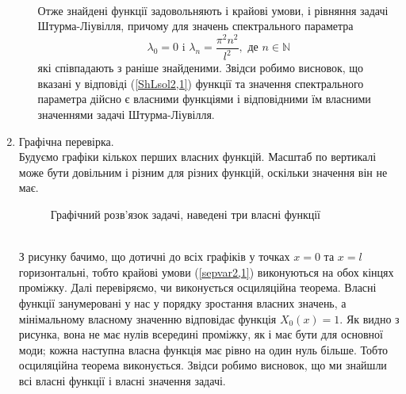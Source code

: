 \begin{enumerate}[wide, labelindent=0pt]
\begin{enumerate}
\begin{equation*}
\begin{aligned}
            \end{aligned} 
        \end{equation*}
        Отже знайдені функції задовольняють і крайові умови, і рівняння задачі Штурма-Ліувілля, причому для значень спектрального параметра \begin{equation}
        \lambda_0 = 0 \text{ i }\lambda_n = \frac{\pi^2 n^2}{l^2}, \text{ де } n \in \mathbb{N}
        \end{equation}які співпадають з раніше знайденими. Звідси робимо висновок, що вказані у відповіді (\ref{ShLsol2,1}) функції та значення спектрального параметра дійсно є власними функціями і відповідними їм власними значеннями задачі Штурма-Ліувілля.
    \end{enumerate}
    \item Графічна перевірка.\\
    Будуємо графіки кількох перших власних функцій. Масштаб по вертикалі може бути довільним і різним для різних функцій, оскільки значення він не має.
    \begin{figure}[h]
        \centering
        \caption{Графічний розв'язок задачі, наведені три власні функції}        
    \end{figure}\\
     З рисунку бачимо, що дотичні до всіх графіків у точках $x = 0$ та $x = l$ горизонтальні, тобто крайові умови (\ref{sepvar2,1}) виконуються на обох кінцях проміжку. Далі перевіряємо, чи виконується осциляційна теорема. Власні функції занумеровані у нас у порядку зростання власних значень, а мінімальному власному значенню відповідає функція $X_0(x) = 1$. Як видно з рисунка, вона не має нулів всередині проміжку, як і має бути для основної моди; кожна наступна власна функція має рівно на один нуль більше. Тобто осциляційна теорема виконується. Звідси робимо висновок, що ми знайшли всі власні функції і власні значення задачі.  \\
   
\end{enumerate}

